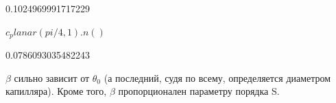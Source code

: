 \documentclass[11pt]{article}
\begin{document}
0.1024969991717229
        

$c_planar(pi/4, 1).n()$

0.0786093035482243
        
    \(\beta\) сильно зависит от \(\theta_{0}\) (а последний, судя по всему,
определяется диаметром капилляра). Кроме того, \(\beta\) пропорционален
параметру порядка S.



\end{document}
